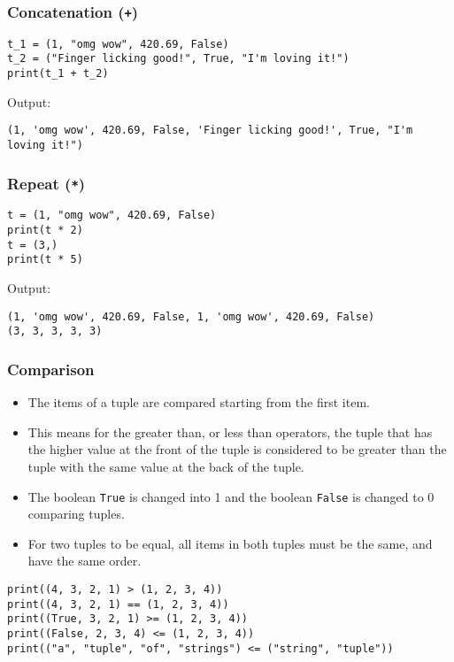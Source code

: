 \documentclass[11pt]{article}
\begin{document}
\subsubsection{Concatenation (\texttt{+})}
\label{sec:orgceba1c8}
\begin{verbatim}
t_1 = (1, "omg wow", 420.69, False)
t_2 = ("Finger licking good!", True, "I'm loving it!")
print(t_1 + t_2)
\end{verbatim}

 \noindent Output:

\begin{verbatim}
(1, 'omg wow', 420.69, False, 'Finger licking good!', True, "I'm loving it!")
\end{verbatim}

\subsubsection{Repeat (\texttt{*})}
\label{sec:orgbef4861}
\begin{verbatim}
t = (1, "omg wow", 420.69, False)
print(t * 2)
t = (3,)
print(t * 5)
\end{verbatim}

 \noindent Output:

\begin{verbatim}
(1, 'omg wow', 420.69, False, 1, 'omg wow', 420.69, False)
(3, 3, 3, 3, 3)
\end{verbatim}

\subsubsection{Comparison}
\label{sec:orgf8eba79}
\begin{itemize}
\item The items of a tuple are compared starting from the first item.
\item This means for the greater than, or less than operators, the tuple that has the higher value at the front of the tuple is considered to be greater than the tuple with the same value at the back of the tuple.
\item The boolean \texttt{True} is changed into 1 and the boolean \texttt{False} is changed to 0 comparing tuples.
\item For two tuples to be equal, all items in both tuples must be the same, and have the same order.
\end{itemize}
\begin{verbatim}
print((4, 3, 2, 1) > (1, 2, 3, 4))
print((4, 3, 2, 1) == (1, 2, 3, 4))
print((True, 3, 2, 1) >= (1, 2, 3, 4))
print((False, 2, 3, 4) <= (1, 2, 3, 4))
print(("a", "tuple", "of", "strings") <= ("string", "tuple"))
\end{verbatim}
\end{document}

